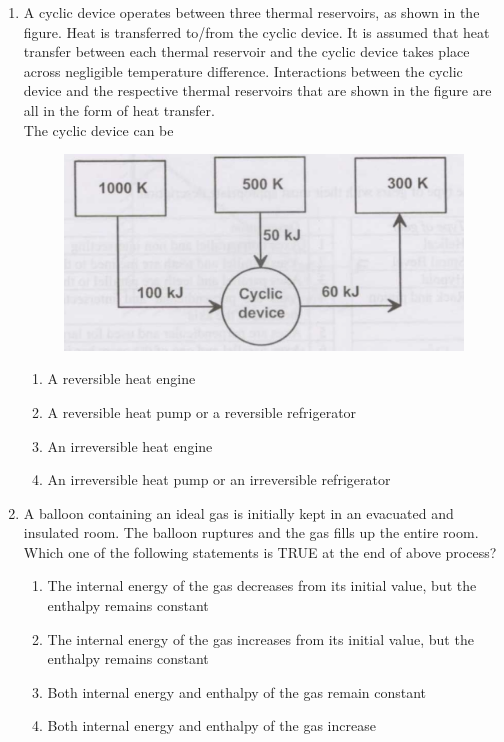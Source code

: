 \documentclass[journal,12pt,onecolumn]{IEEEtran}
\begin{document}
\begin{enumerate}[resume]
    \item A cyclic device operates between three thermal reservoirs, as shown in the figure. Heat is transferred to/from the cyclic device. It is assumed that heat transfer between each thermal reservoir and the cyclic device takes place across negligible temperature difference. Interactions between the cyclic device and the respective thermal reservoirs that are shown in the figure are all in the form of heat transfer.\\
          The cyclic device can be

          \begin{figure}[H]
              \centering
              \includegraphics[scale=0.3]{q47}
              \caption{}
              \label{q47}
          \end{figure}

          \begin{enumerate}
              \item A reversible heat engine
              \item A reversible heat pump or a reversible refrigerator
              \item An irreversible heat engine
              \item An irreversible heat pump or an irreversible refrigerator
          \end{enumerate}

    \item A balloon containing an ideal gas is initially kept in an evacuated and insulated room. The balloon ruptures and the gas fills up the entire room. Which one of the following statements is TRUE at the end of above process?
          \begin{enumerate}
              \item The internal energy of the gas decreases from its initial value, but the enthalpy remains constant
              \item The internal energy of the gas increases from its initial value, but the enthalpy remains constant
              \item Both internal energy and enthalpy of the gas remain constant
              \item Both internal energy and enthalpy of the gas increase
          \end{enumerate}


\end{enumerate}
\end{document}
